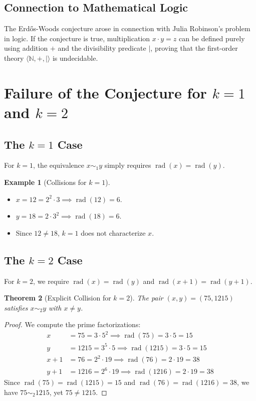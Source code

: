 \documentclass[11pt,a4paper]{article}
\newtheorem{theorem}{Theorem}[section]
\theoremstyle{definition}
\newtheorem{example}[theorem]{Example}
\begin{document}
\subsection{Connection to Mathematical Logic}
The Erd\H{o}s-Woods conjecture arose in connection with Julia Robinson's problem in logic.
If the conjecture is true, multiplication $x \cdot y = z$ can be defined purely using addition $+$ and the divisibility predicate $\mid$, proving that the first-order theory $\langle \mathbb{N}, +, \mid \rangle$ is undecidable.

\section{Failure of the Conjecture for $k = 1$ and $k = 2$}

\subsection{The $k = 1$ Case}
For $k = 1$, the equivalence $x \sim_1 y$ simply requires $\operatorname{rad}(x) = \operatorname{rad}(y)$.

\begin{example}[Collisions for $k = 1$]\label{ex:k1_fail}
\begin{itemize}
    \item $x = 12 = 2^2 \cdot 3 \implies \operatorname{rad}(12) = 6$.
    \item $y = 18 = 2 \cdot 3^2 \implies \operatorname{rad}(18) = 6$.
    \item Since $12 \ne 18$, $k = 1$ does not characterize $x$.
\end{itemize}
\end{example}

\subsection{The $k = 2$ Case}
For $k = 2$, we require $\operatorname{rad}(x) = \operatorname{rad}(y)$ and $\operatorname{rad}(x + 1) = \operatorname{rad}(y + 1)$.

\begin{theorem}[Explicit Collision for $k = 2$]\label{thm:k2_fail}
The pair $(x, y) = (75, 1215)$ satisfies $x \sim_2 y$ with $x \ne y$.
\end{theorem}

\begin{proof}
We compute the prime factorizations:
\begin{align*}
x &= 75 = 3 \cdot 5^2 \implies \operatorname{rad}(75) = 3 \cdot 5 = 15 \\
y &= 1215 = 3^5 \cdot 5 \implies \operatorname{rad}(1215) = 3 \cdot 5 = 15 \\
x + 1 &= 76 = 2^2 \cdot 19 \implies \operatorname{rad}(76) = 2 \cdot 19 = 38 \\
y + 1 &= 1216 = 2^6 \cdot 19 \implies \operatorname{rad}(1216) = 2 \cdot 19 = 38
\end{align*}
Since $\operatorname{rad}(75) = \operatorname{rad}(1215) = 15$ and $\operatorname{rad}(76) = \operatorname{rad}(1216) = 38$, we have $75 \sim_2 1215$, yet $75 \ne 1215$.
\end{proof}
\end{document}
